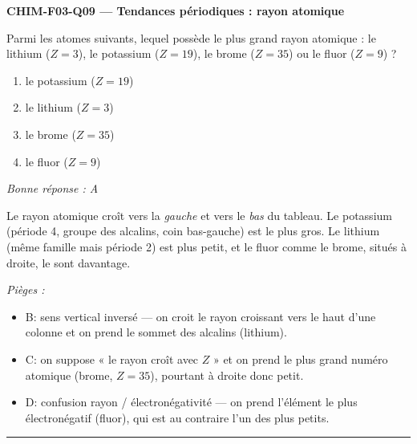 \documentclass[11pt,a4paper]{article}
\begin{document}
\noindent\textbf{CHIM-F03-Q09 --- Tendances périodiques : rayon atomique}\par
Parmi les atomes suivants, lequel possède le plus grand rayon atomique : le lithium ($Z=3$), le potassium ($Z=19$), le brome ($Z=35$) ou le fluor ($Z=9$) ?
\begin{enumerate}[label=\Alph*)]
\item le potassium ($Z=19$)
\item le lithium ($Z=3$)
\item le brome ($Z=35$)
\item le fluor ($Z=9$)
\end{enumerate}
\textit{Bonne réponse : A}\par
Le rayon atomique croît vers la \emph{gauche} et vers le \emph{bas} du tableau. Le potassium (période 4, groupe des alcalins, coin bas-gauche) est le plus gros. Le lithium (même famille mais période 2) est plus petit, et le fluor comme le brome, situés à droite, le sont davantage.\par
\textit{Pièges :}
\begin{itemize}
\item B: sens vertical inversé --- on croit le rayon croissant vers le haut d'une colonne et on prend le sommet des alcalins (lithium).
\item C: on suppose « le rayon croît avec $Z$ » et on prend le plus grand numéro atomique (brome, $Z=35$), pourtant à droite donc petit.
\item D: confusion rayon / électronégativité --- on prend l'élément le plus électronégatif (fluor), qui est au contraire l'un des plus petits.
\end{itemize}
\vspace{8pt}\hrule\vspace{8pt}
\end{document}
